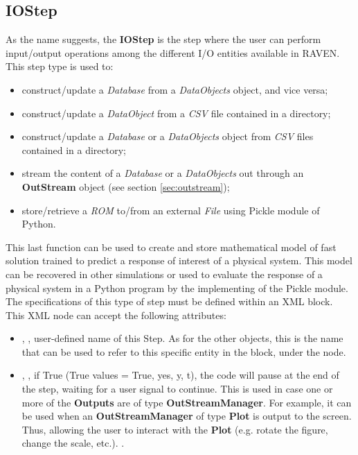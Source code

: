 \subsection{IOStep}
\label{subsec:stepIOStep}
As the name suggests, the \textbf{IOStep} is the step where the user can perform
input/output operations among the different I/O entities available in RAVEN.
%
This step type is used to: 
\begin{itemize}
 \item construct/update a \textit{Database} from a \textit{DataObjects} object, and
   vice versa;
 \item construct/update a \textit{DataObject} from a
   \textit{CSV} file contained in a directory;
 \item construct/update a \textit{Database} or a \textit{DataObjects} object from
   \textit{CSV} files contained in a directory;
 \item stream the content of a \textit{Database} or a \textit{DataObjects} out through
   an \textbf{OutStream} object (see section \ref{sec:outstream});
\item store/retrieve a \textit{ROM} to/from an external \textit{File} using Pickle module
 of Python.
\end{itemize}
This last function can be used to create and store mathematical model of fast solution
 trained to predict a response of interest of a physical system. This model can be 
recovered in other simulations or used to evaluate the response of a physical system
 in a Python program by the implementing of the Pickle module. 
%
The specifications of this type of step must be defined within an
 XML block.
%
This XML node can accept the following attributes:
\vspace{-5mm}
\begin{itemize}
\itemsep0em
\item {}, , user-defined name of
  this Step.
  \nb As for the other objects, this is the name that can be used to refer to
    this specific entity in the  block, under the 
     node.
\item {}, , if True
  (True values = True, yes, y, t), the code will pause at the end of
  the step, waiting for a user signal to continue. This is used in case one or
  more of the \textbf{Outputs} are of type \textbf{OutStreamManager}.
  For example, it can be used when an \textbf{OutStreamManager} of type
  \textbf{Plot} is output to the screen. Thus, allowing the user to interact
  with the \textbf{Plot} (e.g. rotate the figure, change the scale, etc.).
.
\end{itemize}
